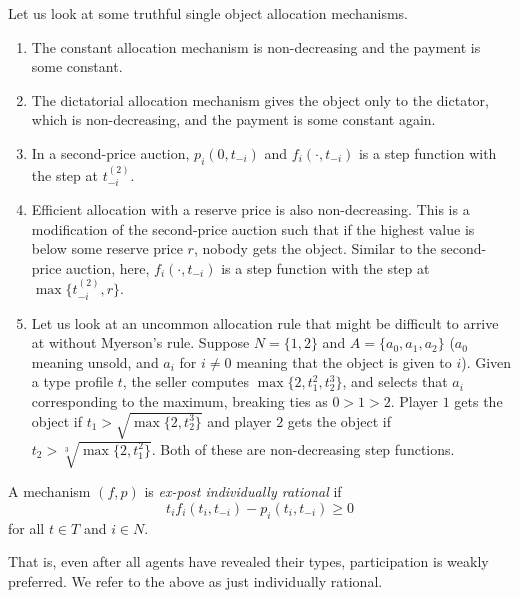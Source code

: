 		\begin{fex}
			Let us look at some truthful single object allocation mechanisms.
			\begin{enumerate}
				\item The constant allocation mechanism is non-decreasing and the payment is some constant.
				\item The dictatorial allocation mechanism gives the object only to the dictator, which is non-decreasing, and the payment is some constant again.
				\item In a second-price auction, $p_i(0,t_{-i})$ and $f_i(\cdot,t_{-i})$ is a step function with the step at $t_{-i}^{(2)}$.
				\item Efficient allocation with a reserve price is also non-decreasing. This is a modification of the second-price auction such that if the highest value is below some reserve price $r$, nobody gets the object. Similar to the second-price auction, here, $f_i(\cdot,t_{-i})$ is a step function with the step at $\max\{t_{-i}^{(2)},r\}$.
				\item Let us look at an uncommon allocation rule that might be difficult to arrive at without Myerson's rule. Suppose $N = \{1,2\}$ and $A = \{a_0,a_1,a_2\}$ ($a_0$ meaning unsold, and $a_i$ for $i \ne 0$ meaning that the object is given to $i$). Given a type profile $t$, the seller computes $\max\{2,t_1^2,t_2^3\}$, and selects that $a_i$ corresponding to the maximum, breaking ties as $0>1>2$. Player $1$ gets the object if $t_1 > \sqrt{\max\{2,t_2^3\}}$ and player $2$ gets the object if $t_2 > \sqrt[3]{\max\{2,t_1^2\}}$. Both of these are non-decreasing step functions.
			\end{enumerate}
		\end{fex}

		\begin{fdef}
			A mechanism $(f,p)$ is \emph{ex-post individually rational} if
			\[ t_i f_i(t_i,t_{-i}) - p_i(t_i,t_{-i}) \ge 0 \]
			for all $t \in T$ and $i \in N$.
		\end{fdef}
		That is, even after all agents have revealed their types, participation is weakly preferred. We refer to the above as just individually rational.

